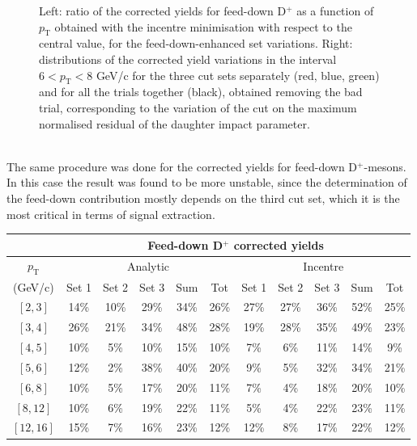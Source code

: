 \documentclass[b5paper,10pt,twoside,oldstyle,classica]{toptesi}
\newcommand{\pt}{p_\text{T}}
\begin{document}
\begin{figure}[tb]
\begin{center}
\caption{Left: ratio of the corrected yields for feed-down D$^+$ as a function of $\pt$ obtained with the incentre minimisation with respect to the central value, for the feed-down-enhanced set variations. Right: distributions of the corrected yield variations in the interval $6<\pt<8$ GeV/c for the three cut sets separately (red, blue, green) and for all the trials together (black), obtained removing the bad trial, corresponding to the variation of the cut on the maximum normalised residual of the daughter impact parameter.}
\label{cutvar_FD_cutsyst}
\end{center}
\end{figure}\\The same procedure was done for the corrected yields for feed-down D$^+$-mesons. In this case the result was found to be more unstable, since the determination of the feed-down contribution mostly depends on the third cut set, which it is the most critical in terms of signal extraction. \begin{table}[b]
\centering 
\begin{center} %
\renewcommand\arraystretch{1.2} 
\fontsize{9}{11}\selectfont
\begin{tabular}{|c|c|c|c|c|c|c|c|c|c|c|}
\cline{2-11}
\multicolumn{1}{c|}{} & \multicolumn{10}{c|}{Feed-down D$^+$ corrected yields}\\
\hline
$\pt$ & \multicolumn{5}{c|}{Analytic} & \multicolumn{5}{c|}{Incentre} \\
\cline{2-11}
(GeV/c) & Set 1 & Set 2 & Set 3 & Sum & Tot & Set 1 & Set 2 & Set 3 & Sum & Tot\\
\hline
$[2,3]$ & 14\% & 10\% & 29\% & 34\% & 26\% & 27\% & 27\% & 36\% & 52\% & 25\%\\
$[3,4]$ & 26\% & 21\% & 34\% & 48\% & 28\% & 19\% & 28\% & 35\% & 49\% & 23\%\\
$[4,5]$ & 10\% & 5\% & 10\% & 15\% & 10\% & 7\% & 6\% & 11\% & 14\% & 9\%\\
$[5,6]$ & 12\% & 2\% & 38\% & 40\% & 20\% & 9\% & 5\% & 32\% & 34\% & 21\%\\
$[6,8]$ & 10\% & 5\% & 17\% & 20\% & 11\% & 7\% & 4\% & 18\% & 20\% & 10\%\\
$[8,12]$ & 10\% & 6\% & 19\% & 22\% & 11\% & 5\% & 4\% & 22\% & 23\% & 11\%\\
$[12,16]$ & 15\% & 7\% & 16\% & 23\% & 12\% & 12\% & 8\% & 17\% & 22\% &12\%\\
\hline
\end{tabular}

\end{center}
\end{table}
\end{document}
